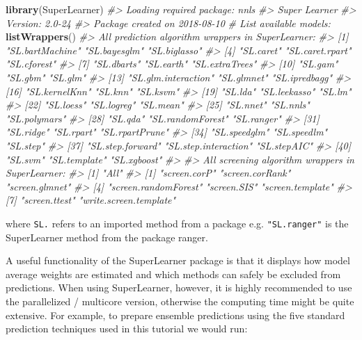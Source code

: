 \documentclass[graybox,natbib,nospthms,UStrade]{svmono}
\newenvironment{Shaded}{\begin{snugshade}}{\end{snugshade}}
\newcommand{\CommentTok}[1]{\textcolor[rgb]{0.37,0.37,0.37}{\textit{#1}}}
\newcommand{\KeywordTok}[1]{\textcolor[rgb]{0.27,0.27,0.27}{\textbf{#1}}}
\newcommand{\NormalTok}[1]{#1}
\begin{document}
\begin{Shaded}
\begin{Highlighting}[]
\KeywordTok{library}\NormalTok{(SuperLearner)}
\CommentTok{#> Loading required package: nnls}
\CommentTok{#> Super Learner}
\CommentTok{#> Version: 2.0-24}
\CommentTok{#> Package created on 2018-08-10}
\CommentTok{# List available models:}
\KeywordTok{listWrappers}\NormalTok{()}
\CommentTok{#> All prediction algorithm wrappers in SuperLearner:}
\CommentTok{#>  [1] "SL.bartMachine"      "SL.bayesglm"         "SL.biglasso"        }
\CommentTok{#>  [4] "SL.caret"            "SL.caret.rpart"      "SL.cforest"         }
\CommentTok{#>  [7] "SL.dbarts"           "SL.earth"            "SL.extraTrees"      }
\CommentTok{#> [10] "SL.gam"              "SL.gbm"              "SL.glm"             }
\CommentTok{#> [13] "SL.glm.interaction"  "SL.glmnet"           "SL.ipredbagg"       }
\CommentTok{#> [16] "SL.kernelKnn"        "SL.knn"              "SL.ksvm"            }
\CommentTok{#> [19] "SL.lda"              "SL.leekasso"         "SL.lm"              }
\CommentTok{#> [22] "SL.loess"            "SL.logreg"           "SL.mean"            }
\CommentTok{#> [25] "SL.nnet"             "SL.nnls"             "SL.polymars"        }
\CommentTok{#> [28] "SL.qda"              "SL.randomForest"     "SL.ranger"          }
\CommentTok{#> [31] "SL.ridge"            "SL.rpart"            "SL.rpartPrune"      }
\CommentTok{#> [34] "SL.speedglm"         "SL.speedlm"          "SL.step"            }
\CommentTok{#> [37] "SL.step.forward"     "SL.step.interaction" "SL.stepAIC"         }
\CommentTok{#> [40] "SL.svm"              "SL.template"         "SL.xgboost"}
\CommentTok{#> }
\CommentTok{#> All screening algorithm wrappers in SuperLearner:}
\CommentTok{#> [1] "All"}
\CommentTok{#> [1] "screen.corP"           "screen.corRank"        "screen.glmnet"        }
\CommentTok{#> [4] "screen.randomForest"   "screen.SIS"            "screen.template"      }
\CommentTok{#> [7] "screen.ttest"          "write.screen.template"}
\end{Highlighting}
\end{Shaded}

where \texttt{SL.} refers to an imported method from a package e.g. \texttt{"SL.ranger"} is the SuperLearner method from the package ranger.

A useful functionality of the SuperLearner package is that it displays how model average weights are estimated and which methods can safely be excluded from predictions. When using SuperLearner, however, it is highly recommended to use the parallelized / multicore version, otherwise the computing time might be quite extensive. For example, to prepare ensemble predictions using the five standard prediction techniques used in this tutorial we would run:
\end{document}
